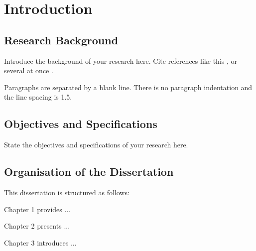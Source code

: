 
\chapter{Introduction}

\section{Research Background}
Introduce the background of your research here. Cite references like this \cite{Author2020Article}, or several at once \cite{Author2021Conference,Author2019Book}.

Paragraphs are separated by a blank line. There is no paragraph indentation and the line spacing is 1.5.


\section{Objectives and Specifications}
State the objectives and specifications of your research here.


\section{Organisation of the Dissertation}
This dissertation is structured as follows:

Chapter 1 provides ...

Chapter 2 presents ...

Chapter 3 introduces ...


\newpage
